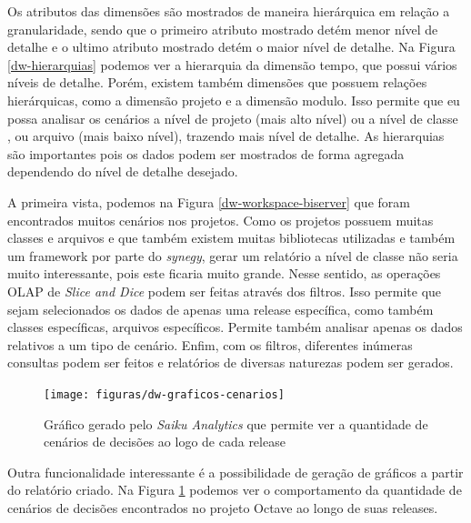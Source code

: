 Os atributos das dimensões são mostrados de maneira hierárquica em relação a granularidade, sendo que o primeiro atributo mostrado detém menor nível de detalhe e o ultimo atributo mostrado detém o maior nível de detalhe. Na Figura \ref{dw-hierarquias} podemos ver a hierarquia da dimensão tempo, que possui vários níveis de detalhe. Porém, existem também dimensões que possuem relações hierárquicas, como a dimensão projeto e a dimensão modulo. Isso permite que eu possa analisar os cenários a nível de projeto (mais alto nível) ou a nível de classe , ou arquivo (mais baixo nível), trazendo mais nível de detalhe. As hierarquias são importantes pois os dados podem ser mostrados de forma agregada dependendo do nível de detalhe desejado.


A primeira vista, podemos na Figura \ref{dw-workspace-biserver} que foram encontrados muitos cenários nos projetos. Como os projetos possuem muitas classes e arquivos e que também existem muitas bibliotecas utilizadas e também um framework por parte do \emph{synegy}, gerar um relatório a nível de classe não seria muito interessante, pois este ficaria muito grande. Nesse sentido, as operações OLAP de \emph{Slice and Dice} podem ser feitas através dos filtros. Isso permite que sejam selecionados os dados de apenas uma release específica, como também classes específicas, arquivos específicos. Permite também analisar apenas os dados relativos a um tipo de cenário. Enfim, com os filtros, diferentes inúmeras consultas podem ser feitos e relatórios de diversas naturezas podem ser gerados.


\begin{figure}[H]
	\centering
	\texttt{[image: figuras/dw-graficos-cenarios]}
	\caption{Gráfico gerado pelo \emph{Saiku Analytics} que permite ver a quantidade de cenários de decisões ao logo de cada release}
	\label{dw-graficos-cenarios}
\end{figure}

Outra funcionalidade interessante é a possibilidade de geração de gráficos a partir do relatório criado. Na Figura \ref{dw-graficos-cenarios} podemos ver o comportamento da quantidade de cenários de decisões encontrados no projeto Octave ao longo de suas releases. 


